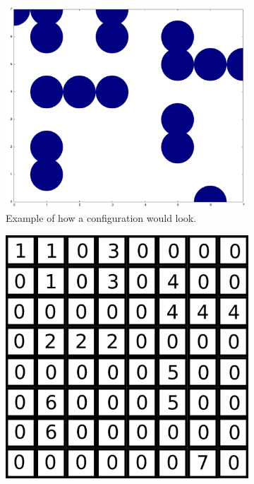 \begin{figure}[h]
	\begin{center}
		\begin{subfigure}[t]{0.23\textwidth}
			\includegraphics[width = \textwidth]{fig/example.png}
			\caption{Example of how a configuration would look.}
			\label{fig:example}
		\end{subfigure}
		\begin{subfigure}[t]{0.23\textwidth}
			\includegraphics[width = \textwidth]{fig/num_grid_example.png}

\end{subfigure}
\end{center}
\end{figure}

